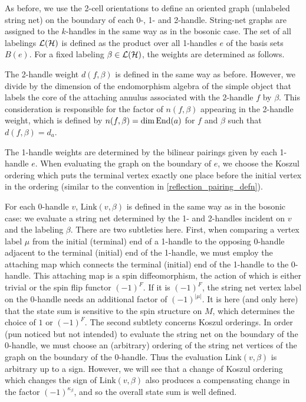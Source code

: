 As before, we use the 2-cell orientations to define an oriented graph (unlabeled string net) on the boundary of each 0-, 1- and 2-handle.
String-net graphs are assigned to the $k$-handles in the same way as in the bosonic case. 
The set of all labelings $\mathcal{L}(\mathcal{H})$ is defined as the product over all 1-handles $e$ of the basis sets $B(e)$.
For a fixed labeling $\beta \in \mathcal{L}(\mathcal{H})$, the weights are determined as follows.

The 2-handle weight $d(f, \beta)$ is defined in the same way as before. However, 
we divide
by the dimension 
of the endomorphism algebra of the simple object that labels the core of the attaching annulus associated with the 2-handle $f$ by $\beta$. 
This consideration is responsible for the factor of $n(f,\beta)$ appearing 
in the 2-handle weight, 
which is defined by $n(f,\beta)=\dim \text{End}(a)$ for $f$ and $\beta$
such that $d(f,\beta)=d_a$. 


The 1-handle weights are determined by the bilinear pairings given by each 1-handle $e$. 
When evaluating the graph on the boundary of $e$, we choose the Koszul ordering which puts the terminal vertex
exactly one place before the initial vertex in the ordering (similar to the convention in \eqref{reflection_pairing_defn}).

For each 0-handle $v$, $\text{Link}(v,\beta)$ is defined in the same way as in the bosonic case:
we evaluate a string net determined by the 1- and 2-handles incident on $v$ and the labeling $\beta$.
There are two subtleties here.
First, when comparing a vertex label $\mu$ from the initial (terminal) end of a 1-handle to the opposing 0-handle adjacent to the terminal (initial) end of the 1-handle, 
we must employ the attaching map which connects the terminal (initial) end of the 1-handle to the 0-handle.
This attaching map is a spin diffeomorphism, the action of which is either trivial or the spin flip functor $(-1)^F$.
If it is $(-1)^F$, the string net vertex label on the 0-handle needs an additional factor of $(-1)^{|\mu|}$.
It is here (and only here) that the state sum is sensitive to the spin structure on $M$, which determines 
the choice of $1$ or $(-1)^F$.
The second subtlety concerns Koszul orderings.
In order (pun noticed but not intended) \ethan{:)}
to evaluate the string net on the boundary of the 0-handle, we must choose an (arbitrary) ordering
of the string net vertices of the graph on the boundary of the 0-handle.
Thus the evaluation $\text{Link}(v, \beta)$ is arbitrary up to a sign.
However, we will see that a change of Koszul ordering which changes the sign of $\text{Link}(v, \beta)$ also produces a compensating
change in the factor $(-1)^{\kappa_\beta}$, and so the overall state sum is well defined.

